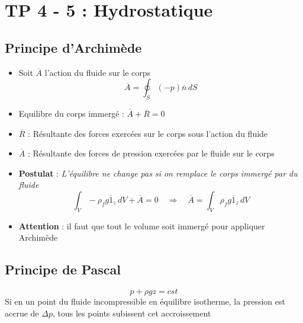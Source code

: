 \section*{TP 4 - 5 : Hydrostatique}
\subsection*{Principe d'Archimède}
\begin{itemize}

	\item Soit $\overline{A}$ l'action du fluide sur le corps
		\begin{equation}
			\overline{A} = \oint _S (-p) \overline{n} \, dS 
		\end{equation}
	
	\item Equilibre du corps immergé : $\overline{A} + \overline{R} = 0$
	\item $\overline{R}$ : Résultante des forces exercées sur le corps sous l'action du fluide
	\item $\overline{A}$ : Résultante des forces de pression exercées par le fluide sur le corps
	\item \textbf{Postulat} : \textit{L'équilibre ne change pas si on remplace le corps immergé par du fluide}
		\begin{equation}
			\int _V -\rho _f g \overline{1}_z \, dV + \overline{A} = 0 \quad \Rightarrow \quad \overline{A} = \int _V \rho _f g \overline{1}_z \, dV
		\end{equation}
	\item \textbf{Attention} : il faut que tout le volume soit immergé pour appliquer Archimède
\end{itemize}

\subsection*{Principe de Pascal}

	\begin{equation}
		p + \rho g z = cst
	\end{equation}
	\noindent Si en un point du fluide incompressible en équilibre isotherme, la pression est accrue de $\Delta p$, tous les points subissent cet accroissement

